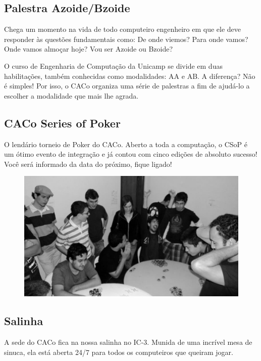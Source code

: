 \subsection{Palestra Azoide/Bzoide}

Chega um momento na vida de todo computeiro engenheiro em que ele deve responder
às questões fundamentais como: De onde viemos? Para onde vamos? Onde vamos
almoçar hoje? Vou ser Azoide ou Bzoide?

O curso de Engenharia de Computação da Unicamp se divide em duas habilitações, também conhecidas como modalidades: AA
e AB. A diferença? Não é simples! Por isso, o CACo organiza uma série de
palestras a fim de ajudá-lo a escolher a modalidade que mais lhe agrada.

\subsection{CACo Series of Poker}

O lendário torneio de Poker do CACo. Aberto a toda a computação, o CSoP é um
ótimo evento de integração e já contou com cinco edições de absoluto sucesso!
Você será informado da data do próximo, fique ligado!

\begin{figure}[H]
    \centering
    \includegraphics[scale=0.21]{img/caco/poker2.jpg}
\end{figure}

\subsection{Salinha}

A sede do CACo fica na nossa salinha no IC-3. Munida de uma incrível mesa de
sinuca, ela está aberta 24/7 para todos os computeiros que queiram jogar.

